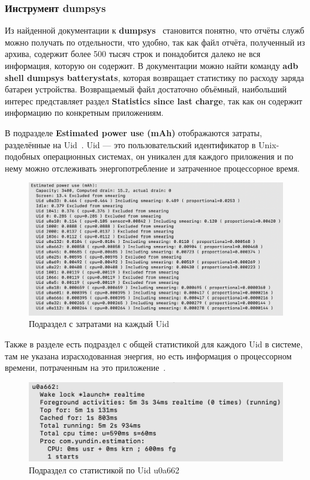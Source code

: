 \documentclass[a4paper,14pt]{extarticle} %
\begin{document}
	\subsubsection{Инструмент dumpsys} \label{subsub:dumpsys}
	
	Из найденной документации к \textbf{dumpsys}~\parencite{Dumpsys} становится понятно, что отчёты служб можно получать по отдельности, что удобно, так как файл отчёта, полученный из архива, содержит более 500 тысяч строк и понадобится далеко не вся информация, которую он содержит. В документации можно найти команду \textbf{adb shell dumpsys batterystats}, которая возвращает статистику по расходу заряда батареи устройства. Возвращаемый файл достаточно объёмный, наибольший интерес представляет раздел \textbf{Statistics since last charge}, так как он содержит информацию по конкретным приложениям.
	
	В подразделе \textbf{Estimated power use (mAh)} отображаются затраты, разделённые на Uid~\ris{\ref{fig:estimated_use}}. Uid --- это пользовательский идентификатор в Unix-подобных операционных системах, он уникален для каждого приложения и по нему можно отслеживать энергопотребление и затраченное процессорное время.
	
	\begin{figure}[!htb]
		\includegraphics[width=\textwidth]{estimated_use}
		\caption{Подраздел с затратами на каждый Uid}
		\label{fig:estimated_use}
	\end{figure}
	
	Также в разделе есть подраздел с общей статистикой для каждого Uid в системе, там не указана израсходованная энергия, но есть информация о процессорном времени, потраченным на это приложение~\ris{\ref{fig:uid_subsection}}.

	\begin{figure}[!htb]
		\includegraphics[width=\textwidth]{uid_subsection}
		\caption{Подраздел со статистикой по Uid u0a662}
		\label{fig:uid_subsection}
	\end{figure}
\end{document}
